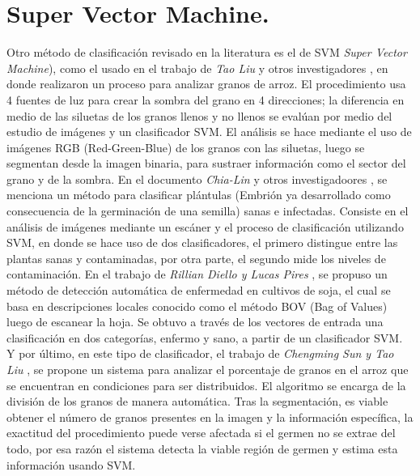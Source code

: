 \section{Super Vector Machine.}
	Otro método de clasificación revisado en la literatura es el de SVM \textit{Super Vector Machine}), como el usado en el trabajo de \textit{Tao Liu} y otros investigadores \cite{LIU201679}, en donde realizaron un proceso para analizar granos de arroz. El procedimiento usa 4 fuentes de luz para crear la sombra del grano en 4 direcciones; la diferencia en medio de las siluetas de los granos llenos y no llenos se evalúan por medio del estudio de imágenes y un clasificador SVM. El análisis se hace mediante el uso de imágenes RGB (Red-Green-Blue) de los granos con las siluetas, luego se segmentan desde la imagen binaria, para sustraer información como el sector del grano y de la sombra. En el documento \textit{Chia-Lin}  y otros investigadoores \cite{CHUNG2016404}, se menciona un método para clasificar plántulas (Embrión ya desarrollado como consecuencia de la germinación de una semilla) sanas e infectadas. Consiste en el análisis de imágenes mediante un escáner y el proceso de clasificación utilizando SVM, en donde se hace uso de dos clasificadores, el primero distingue entre las plantas sanas y contaminadas, por otra parte, el segundo mide los niveles de contaminación. En el trabajo de \textit{Rillian Diello y Lucas Pires} \cite{PIRES201648}, se propuso un método de detección automática de enfermedad en cultivos de soja, el cual se basa en descripciones locales conocido como el método BOV (Bag of Values) luego de escanear la hoja. Se obtuvo a través de los vectores de entrada una clasificación en dos categorías, enfermo y sano, a partir de un clasificador SVM. Y por último, en este tipo de clasificador, el trabajo de \textit{Chengming Sun y Tao Liu} \cite{SUN2014426}, se propone un sistema para analizar el porcentaje de granos en el arroz que se encuentran en condiciones para ser distribuidos. El algoritmo se encarga de la división de los granos de manera automática. Tras la segmentación, es viable obtener el número de granos presentes en la imagen y la información específica, la exactitud del procedimiento puede verse afectada si el germen no se extrae del todo, por esa razón el sistema detecta la viable región de germen y estima esta información usando SVM.\\

